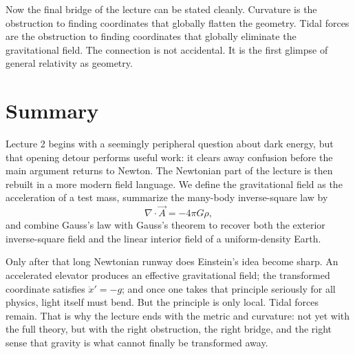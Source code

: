 Now the final bridge of the lecture can be stated cleanly. Curvature is the obstruction to finding coordinates that globally flatten the geometry. Tidal forces are the obstruction to finding coordinates that globally eliminate the gravitational field. The connection is not accidental. It is the first glimpse of general relativity as geometry.

\section{Summary}

Lecture 2 begins with a seemingly peripheral question about dark energy, but that opening detour performs useful work: it clears away confusion before the main argument returns to Newton. The Newtonian part of the lecture is then rebuilt in a more modern field language. We define the gravitational field as the acceleration of a test mass, summarize the many-body inverse-square law by
\[
\nabla\cdot\vec A = -4\pi G\rho,
\]
and combine Gauss's law with Gauss's theorem to recover both the exterior inverse-square field and the linear interior field of a uniform-density Earth.

Only after that long Newtonian runway does Einstein's idea become sharp. An accelerated elevator produces an effective gravitational field; the transformed coordinate satisfies $\ddot x'=-g$; and once one takes that principle seriously for all physics, light itself must bend. But the principle is only local. Tidal forces remain. That is why the lecture ends with the metric and curvature: not yet with the full theory, but with the right obstruction, the right bridge, and the right sense that gravity is what cannot finally be transformed away.
